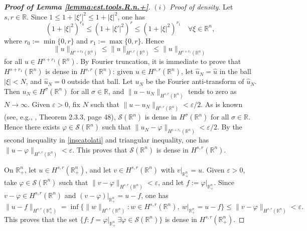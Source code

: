\documentclass[10pt,reqno,a4paper]{article}
\numberwithin{equation}{section}
\theoremstyle{plain}
\theoremstyle{definition}
\newcommand{\R}{{\mathbb R}}
\newcommand{\mS}{\mathcal{S}}
\newcommand{\e}{\varepsilon}
\newcommand{\ph}{\varphi}
\newcommand{\s}{\sigma}
\begin{document}
\begin{proof}[\textbf{Proof of Lemma \ref{lemma:est.tools.R.n.+}}] 
$(i)$ \emph{Proof of density}. Let $s,r \in \R$.  
Since $1 \leq 1 + |\xi'|^2 \leq 1 + |\xi|^2$, one has 
\[
(1 + |\xi|^2)^{r_0} \leq (1 + |\xi'|^2)^r \leq (1 + |\xi|^2)^{r_1} \quad \forall \xi \in \R^n, 
\]
where $r_0 := \min \{ 0, r \}$ and $r_1 := \max \{ 0, r \}$.
Hence 
\begin{equation} \label{inscatolati}
\| u \|_{H^{s + r_0}(\R^n)} \leq \| u \|_{H^{s,r}(\R^n)} \leq \| u \|_{H^{s + r_1}(\R^n)}
\end{equation}
for all $u \in H^{s + r_1}(\R^n)$. 
By Fourier truncation, it is immediate to prove that 
$H^{s + r_1}(\R^n)$ is dense in $H^{s,r}(\R^n)$: 
given $u \in H^{s,r}(\R^n)$, 
let $\hat u_N = \hat u$ in the ball $|\xi| < N$, 
and $\hat u_N = 0$ outside that ball. 
Let $u_N$ be the Fourier anti-transform of $\hat u_N$. 
Then $u_N \in H^\s(\R^n)$ for all $\s \in \R$,  
and $\| u - u_N \|_{H^{s,r}(\R^n)}$ tends to zero as $N \to \infty$. 
Given $\e > 0$, fix $N$ such that $\| u - u_N \|_{H^{s,r}(\R^n)} < \e/2$. 
As is known (see, e.g., \cite{Triebel.1983}, Theorem 2.3.3, page 48), 
$\mS(\R^n)$ is dense in $H^\s(\R^n)$ for all $\s \in \R$.  
Hence there exists $\ph \in \mS(\R^n)$ such that $\| u_N - \ph \|_{H^{s+r_1}(\R^n)} < \e/2$. 
By the second inequality in \eqref{inscatolati} and triangular inequality, 
one has $\| u - \ph \|_{H^{s,r}(\R^n)} < \e$. 
This proves that $\mS(\R^n)$ is dense in $H^{s,r}(\R^n)$. 

On $\R^n_+$, let $u \in H^{s,r}(\R^n_+)$, and let $v \in H^{s,r}(\R^n)$ 
with $v |_{\R^n_+} = u$. Given $\e > 0$, take $\ph \in \mS(\R^n)$ such that 
$\| v - \ph \|_{H^{s,r}(\R^n)} < \e$, and let $f := \ph |_{\R^n_+}$. 
Since $v - \ph \in H^{s,r}(\R^n)$ and $(v-\ph)|_{\R^n_+} = u-f$,  
one has
\[
\| u - f \|_{H^{s,r}(\R^n_+)} 
= \inf \{ \| w \|_{H^{s,r}(\R^n)} : w \in H^{s,r}(\R^n), \ w |_{\R^n_+} = u-f \} 
\leq \| v - \ph \|_{H^{s,r}(\R^n)} < \e.
\]
This proves that the set $\{ f : f = \ph |_{\R^n_+} \ \exists \ph \in \mS(\R^n) \}$ 
is dense in $H^{s,r}(\R^n_+)$. 


\medskip



\end{proof}
\end{document}
